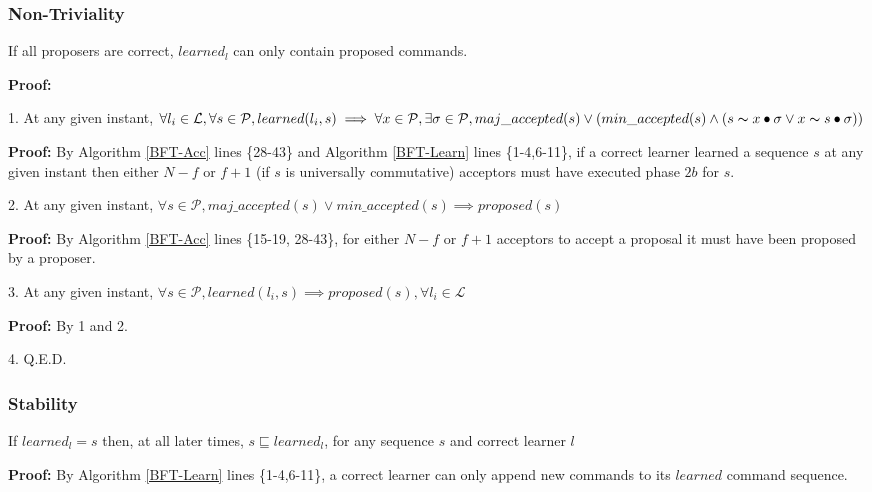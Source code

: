 \subsubsection{Non-Triviality}
\begin{theorem}
If all proposers are correct, $learned_l$ can only contain proposed commands. \label{N-T1} \par
\end{theorem} 
\textbf{Proof:} \par
\parbox{\linewidth}{\strut1. At any given instant, $\forall l_i \in \mathcal{L}, \forall s \in \mathcal{P}, learned(l_i,s) \implies \forall x \in \mathcal{P}, \exists \sigma \in \mathcal{P},  maj\_accepted(s) \lor (min\_accepted(s) \land  (s \thicksim x \bullet \sigma \lor x \thicksim s \bullet \sigma))$ }\par
\indent\indent\parbox{\linewidth}{\strut\textbf{Proof:} By Algorithm \ref{BFT-Acc} lines \{28-43\} and Algorithm \ref{BFT-Learn} lines \{1-4,6-11\}, if a correct learner learned a sequence $s$ at any given instant then either $N-f$ or $f+1$ (if $s$ is universally commutative) acceptors must have executed phase $2b$ for $s$.}\par
\parbox{\linewidth}{\strut2. At any given instant, $\forall s \in \mathcal{P}, maj\_accepted(s) \lor min\_accepted(s) \implies proposed(s)$ }\par
\indent\indent\parbox{\linewidth}{\strut\textbf{Proof:} By Algorithm \ref{BFT-Acc} lines \{15-19, 28-43\}, for either $N-f$ or $f+1$ acceptors to accept a proposal it must have been proposed by a proposer.}\par
\parbox{\linewidth}{\strut3. At any given instant, $\forall s \in \mathcal{P}, learned(l_i,s) \implies proposed(s),\forall l_i \in \mathcal{L}$}\par
\indent\indent\parbox{\linewidth}{\strut\textbf{Proof:} By 1 and 2.}\par
\parbox{\linewidth}{\strut4. Q.E.D.}\par

\subsubsection{Stability}
\begin{theorem}
If $learned_l = s$ then, at all later times, $s \sqsubseteq learned_l$, for any sequence $s$ and correct learner $l$ \par \label{S-T1}
\end{theorem} 
\textbf{Proof:} By Algorithm \ref{BFT-Learn} lines \{1-4,6-11\}, a correct learner can only append new commands to its $learned$ command sequence.

